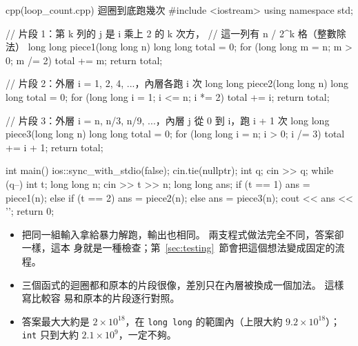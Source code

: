 \begin{example}[label=ex:loop-count]{cpp}{(loop\_count.cpp) 迴圈到底跑幾次}
#include <iostream>
using namespace std;

// 片段 1：第 k 列的 j 是 i 乘上 2 的 k 次方，
// 這一列有 n / 2^k 格（整數除法）
long long piece1(long long n) {
    long long total = 0;
    for (long long m = n; m > 0; m /= 2) {
        total += m;
    }
    return total;
}

// 片段 2：外層 i = 1, 2, 4, ...，內層各跑 i 次
long long piece2(long long n) {
    long long total = 0;
    for (long long i = 1; i <= n; i *= 2) {
        total += i;
    }
    return total;
}

// 片段 3：外層 i = n, n/3, n/9, ...，內層 j 從 0 到 i，跑 i + 1 次
long long piece3(long long n) {
    long long total = 0;
    for (long long i = n; i > 0; i /= 3) {
        total += i + 1;
    }
    return total;
}

int main() {
    ios::sync_with_stdio(false);
    cin.tie(nullptr);
    int q;
    cin >> q;
    while (q--) {
        int t;
        long long n;
        cin >> t >> n;
        long long ans;
        if (t == 1) {
            ans = piece1(n);
        } else if (t == 2) {
            ans = piece2(n);
        } else {
            ans = piece3(n);
        }
        cout << ans << '\n';
    }
    return 0;
}
\end{example}


\begin{itemize}
\item 把同一組輸入拿給暴力解跑，輸出也相同。 兩支程式做法完全不同，答案卻一樣，這本
身就是一種檢查；第~\ref{sec:testing}~節會把這個想法變成固定的流程。
\item 三個函式的迴圈都和原本的片段很像，差別只在內層被換成一個加法。 這樣寫比較容
易和原本的片段逐行對照。
\item 答案最大大約是 $2 \times 10^{18}$，在 \texttt{long long} 的範圍內（上限大約
$9.2 \times 10^{18}$）；\texttt{int} 只到大約 $2.1 \times 10^9$，一定不夠。
\end{itemize}


